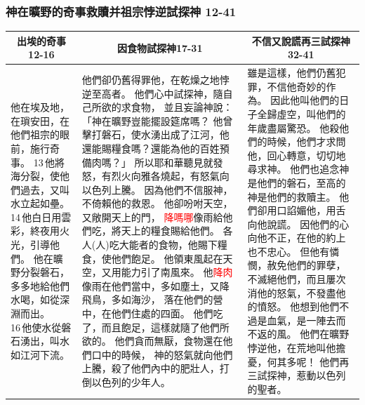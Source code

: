 \subsubsection{神在曠野的奇事救贖并祖宗悖逆試探神 12-41}
\begin{table}[H]
\hspace{-6mm}
\centering
\begin{tabular}{p{2.75cm}|p{8.25cm}|p{5.75cm}}\hline\hline
\multicolumn{1}{c|}{出埃的奇事12-16}&\multicolumn{1}{c|}{因食物試探神17-31}&\multicolumn{1}{c}{不信又說謊再三試探神32-41}\\\hline\hline
他在埃及地，在瑣安田，在他們祖宗的眼前，施行奇事。
13 他將海分裂，使他們過去，又叫水立起如壘。
14 他白日用雲彩，終夜用火光，引導他們。
他在曠野分裂磐石，多多地給他們水喝，如從深淵而出。
16 他使水從磐石湧出，叫水如江河下流。
&\multirow{2}{8.4cm}{他們卻仍舊得罪他，在乾燥之地悖逆至高者。
他們心中試探神，隨自己所欲的求食物，
並且妄論神說：「神在曠野豈能擺設筵席嗎？
他曾擊打磐石，使水湧出成了江河，他還能賜糧食嗎？還能為他的百姓預備肉嗎？」
所以耶和華聽見就發怒，有烈火向雅各燒起，有怒氣向以色列上騰。
因為他們不信服神，不倚賴他的救恩。
他卻吩咐天空，又敞開天上的門，
\textcolor{red}{降嗎哪}像雨給他們吃，將天上的糧食賜給他們。
各人(人)吃大能者的食物，他賜下糧食，使他們飽足。
他領東風起在天空，又用能力引了南風來。
他\textcolor{red}{降肉}像雨在他們當中，多如塵土，又降飛鳥，多如海沙，
落在他們的營中，在他們住處的四面。
他們吃了，而且飽足，這樣就隨了他們所欲的。
他們貪而無厭，食物還在他們口中的時候，
神的怒氣就向他們上騰，殺了他們內中的肥壯人，打倒以色列的少年人。}
&\multirow{2}{5.9cm}{雖是這樣，他們仍舊犯罪，不信他奇妙的作為。
因此他叫他們的日子全歸虛空，叫他們的年歲盡屬驚恐。
他殺他們的時候，他們才求問他，回心轉意，切切地尋求神。
他們也追念神是他們的磐石，至高的神是他們的救贖主。
他們卻用口諂媚他，用舌向他說謊。
因他們的心向他不正，在他的約上也不忠心。
但他有憐憫，赦免他們的罪孽，不滅絕他們，而且屢次消他的怒氣，不發盡他的憤怒。
他想到他們不過是血氣，是一陣去而不返的風。
他們在曠野悖逆他，在荒地叫他擔憂，何其多呢！
他們再三試探神，惹動以色列的聖者。}\\\hline
\end{tabular}
\end{table}

